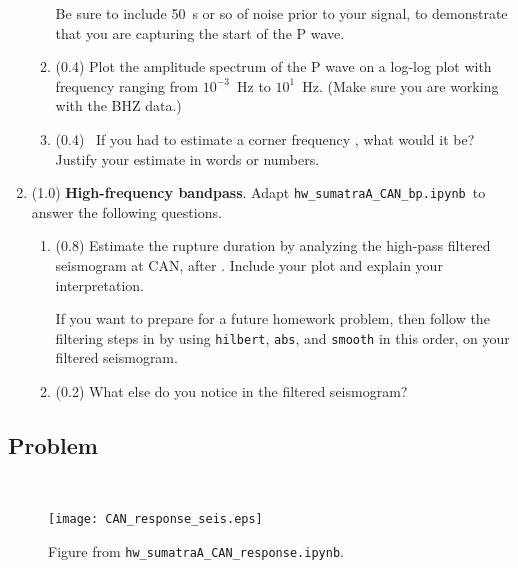 \documentclass[11pt,titlepage,fleqn]{article}
\newcommand{\tfileresponse}{{\tt hw\_sumatraA\_CAN\_response.ipynb}}
\newcommand{\tfilebp}{{\tt hw\_sumatraA\_CAN\_bp.ipynb}}
\begin{document}
\begin{enumerate}
\begin{enumerate}
Be sure to include 50~s or so of noise prior to your signal, to demonstrate that you are capturing the start of the P wave.

\item (0.4) Plot the amplitude spectrum of the P wave on a log-log plot with frequency ranging from $10^{-3}$~Hz to $10^1$~Hz. (Make sure you are working with the BHZ data.)


\item (0.4) \ptag\ If you had to estimate a corner frequency \citep[][p.~267]{SteinWysession}, what would it be? Justify your estimate in words or numbers.
\end{enumerate}


\item (1.0) {\bf High-frequency bandpass}. Adapt \tfilebp\ to answer the following questions.
%
\begin{enumerate}
\item (0.8) Estimate the rupture duration by analyzing the high-pass filtered seismogram at CAN, after \citet{Ni2005}. Include your plot and explain your interpretation.

If you want to prepare for a future homework problem, then follow the filtering steps in \citet{Ni2005} by using \verb+hilbert+, \verb+abs+, and \verb+smooth+ in this order, on your filtered seismogram.

\item (0.2) What else do you notice in the filtered seismogram?
\end{enumerate}

\end{enumerate}


\subsection*{Problem} \howmuchtime\




%

\begin{figure}
\hspace{-1cm}
\texttt{[image: CAN\_response\_seis.eps]}
\caption[]
{{
Figure from \tfileresponse.
}}
\label{fig:seis}
\end{figure}

\end{document}
